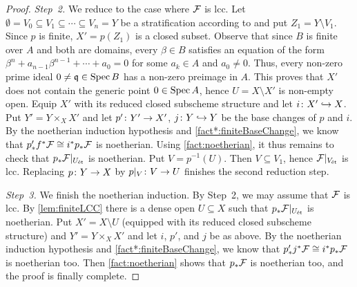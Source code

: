 \begin{proof}
	\emph{Step~2.} We reduce to the case where $\mathcal{F}$ is lcc. Let $\emptyset=V_0\subseteq V_1\subseteq \dotsb \subseteq V_n=Y$ be a stratification according to  and put $Z_1=Y\setminus V_1$. Since $p$ is finite, $X'= p(Z_1)$ is a closed subset. Observe that since $B$ is finite over $A$ and both are domains, every $\beta\in B$ satisfies an equation of the form $\beta^n+a_{n-1}\beta^{n-1}+\dotsb+a_0=0$ for some $a_k\in A$ and $a_0\neq 0$. Thus, every non-zero prime ideal $0\neq \mathfrak{q}\in \operatorname{Spec} B$ has a non-zero preimage in $A$. This proves that $X'$ does not contain the generic point $0\in \operatorname{Spec} A$, hence $U=X\setminus X'$ is non-empty open. Equip $X'$ with its reduced closed subscheme structure and let $i\colon X'\monomorphism X$. Put $Y'= Y\times_XX'$ and let $p'\colon Y'\morphism X'$, $j\colon Y\monomorphism Y$ be the base changes of $p$ and $i$. By the noetherian induction hypothesis and \cref{fact*:finiteBaseChange}, we know that $p'_*f^*\mathcal{F}\cong i^*p_*\mathcal{F}$ is noetherian. Using \cref{fact:noetherian}, it thus remains to check that $p_*\mathcal{F}|_{U_{\mathrm{\acute{e}t}}}$ is noetherian. Put $V=p^{-1}(U)$. Then $V\subseteq V_1$, hence $\mathcal{F}|_{V_{\mathrm{\acute{e}t}}}$ is lcc. Replacing $p\colon Y\morphism X$ by $p|_V\colon V\morphism U$ finishes the second reduction step.
	
	\emph{Step~3.} We finish the noetherian induction. By Step~2, we may assume that $\mathcal{F}$ is lcc. By \cref{lem:finiteLCC} there is a dense open $U\subseteq X$ such that $p_*\mathcal{F}|_{U_{\mathrm{\acute{e}t}}}$ is noetherian. Put $X'= X\setminus U$ (equipped with its reduced closed subscheme structure) and $Y'= Y\times_XX'$ and let $i$, $p'$, and $j$ be as above. By the noetherian induction hypothesis and \cref{fact*:finiteBaseChange}, we know that $p'_*j^*\mathcal{F}\cong i^*p_*\mathcal{F}$ is noetherian too. Then \cref{fact:noetherian} shows that $p_*\mathcal{F}$ is noetherian too, and the proof is finally complete.
\end{proof}
